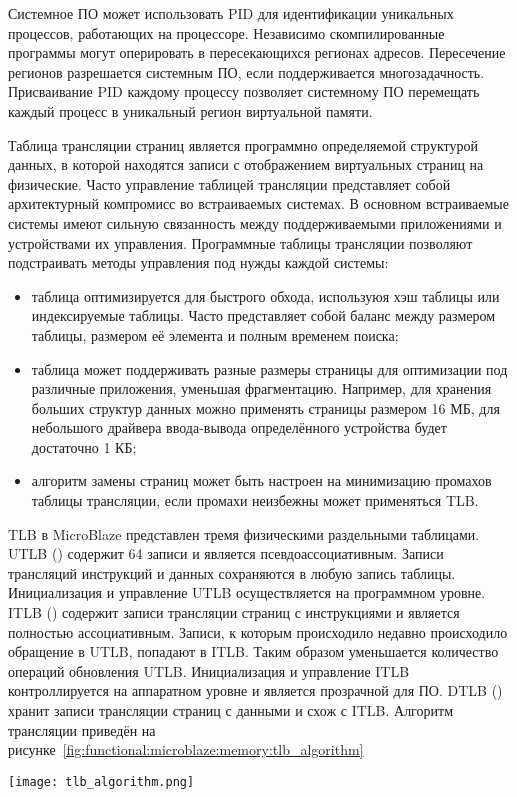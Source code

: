 Системное ПО может использовать PID для идентификации уникальных процессов, работающих
на процессоре. Независимо скомпилированные программы могут оперировать
в пересекающихся регионах адресов. Пересечение регионов разрешается
системным ПО, если поддерживается многозадачность. Присваивание PID каждому процессу
позволяет системному ПО перемещать каждый процесс в уникальный регион виртуальной
памяти.

Таблица трансляции страниц является программно определяемой структурой данных,
в которой находятся записи с отображением виртуальных страниц на физические. Часто
управление таблицей трансляции представляет собой архитектурный компромисс во встраиваемых
системах. В основном встраиваемые системы имеют сильную связанность между поддерживаемыми
приложениями и устройствами их управления. Программные таблицы трансляции позволяют подстраивать
методы управления под нужды каждой системы:
\begin{itemize}
  \item таблица оптимизируется для быстрого обхода, используюя хэш таблицы или
    индексируемые таблицы. Часто представляет собой баланс между размером таблицы,
    размером её элемента и полным временем поиска;
  \item таблица может поддерживать разные размеры страницы для оптимизации под различные
    приложения, уменьшая фрагментацию. Например, для хранения больших структур данных
    можно применять страницы размером 16 МБ, для небольшого драйвера ввода-вывода определённого
    устройства будет достаточно 1 КБ;
  \item алгоритм замены страниц может быть настроен на минимизацию промахов таблицы трансляции,
    если промахи неизбежны может применяться TLB.
\end{itemize}

TLB в MicroBlaze представлен тремя физическими раздельными таблицами.
UTLB () содержит 64 записи и является псевдоассоциативным. Записи трансляций
инструкций и данных сохраняются в любую запись таблицы. Инициализация и управление UTLB
осуществляется на программном уровне. ITLB () содержит
записи трансляции страниц с инструкциями и является полностью ассоциативным. Записи, к которым
происходило недавно происходило обращение в UTLB, попадают в ITLB. Таким образом уменьшается
количество операций обновления UTLB. Инициализация и управление ITLB контроллируется на аппаратном
уровне и является прозрачной для ПО. DTLB () хранит записи трансляции страниц с
данными и схож с ITLB. Алгоритм трансляции приведён на рисунке~\ref{fig:functional:microblaze:memory:tlb_algorithm}
\begin{center}
  \centering
  \texttt{[image: tlb\_algorithm.png]}
  \label{fig:functional:microblaze:memory:tlb_algorithm}
\end{center}

